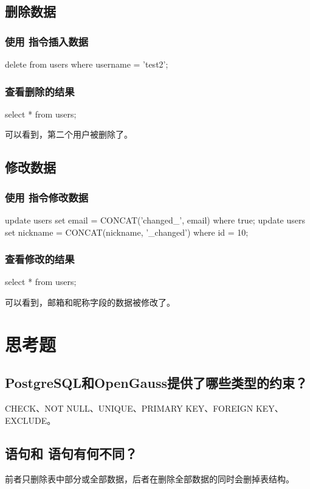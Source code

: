 \documentclass{ctexrep}
\begin{document}
\subsection{删除数据}
\subsubsection{使用  指令插入数据}
\begin{run}
    delete from users where username = 'test2';
\end{run}
\subsubsection{查看删除的结果}
\begin{run}
    select * from users;
\end{run}
可以看到，第二个用户被删除了。
\subsection{修改数据}
\subsubsection{使用  指令修改数据}
\begin{run}
    update users set email = CONCAT('changed_', email) where true;
    update users set nickname = CONCAT(nickname, '_changed') where id = 10;
\end{run}
\subsubsection{查看修改的结果}
\begin{run}
    select * from users;
\end{run}
可以看到，邮箱和昵称字段的数据被修改了。
\section{思考题}
\subsection*{PostgreSQL和OpenGauss提供了哪些类型的约束？}
CHECK、NOT NULL、UNIQUE、PRIMARY KEY、FOREIGN KEY、EXCLUDE。

\subsection*{ 语句和  语句有何不同？}
前者只删除表中部分或全部数据，后者在删除全部数据的同时会删掉表结构。
\end{document}

